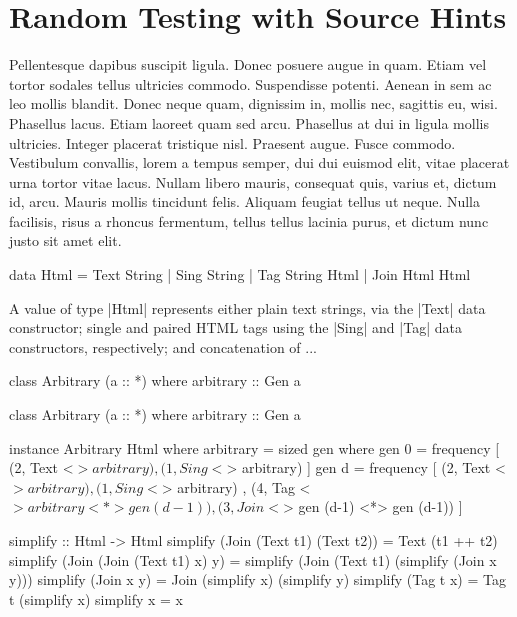 \section{Random Testing with Source Hints}
\label{sec:sources}

Pellentesque dapibus suscipit ligula. Donec posuere augue in quam. Etiam vel
tortor sodales tellus ultricies commodo. Suspendisse potenti. Aenean in sem ac
leo mollis blandit. Donec neque quam, dignissim in, mollis nec, sagittis eu,
wisi. Phasellus lacus. Etiam laoreet quam sed arcu. Phasellus at dui in ligula
mollis ultricies. Integer placerat tristique nisl. Praesent augue. Fusce
commodo. Vestibulum convallis, lorem a tempus semper, dui dui euismod elit,
vitae placerat urna tortor vitae lacus. Nullam libero mauris, consequat quis,
varius et, dictum id, arcu. Mauris mollis tincidunt felis. Aliquam feugiat
tellus ut neque. Nulla facilisis, risus a rhoncus fermentum, tellus tellus
lacinia purus, et dictum nunc justo sit amet elit.

\begin{code}
data Html
  =  Text  String
  |  Sing  String
  |  Tag   String Html
  |  Join  Html Html
\end{code}

A value of type |Html| represents either plain text strings, via the |Text| data
constructor; single and paired HTML tags using the |Sing| and |Tag| data
constructors, respectively; and concatenation of ...

\begin{code}
class Arbitrary (a :: *) where
  arbitrary :: Gen a
\end{code}

\begin{code}
class Arbitrary (a :: *) where
  arbitrary :: Gen a
\end{code}

\begin{code}
instance Arbitrary Html where
  arbitrary = sized gen
    where
      gen 0 = frequency
        [  (2,  Text    <$> arbitrary)
        ,  (1,  Sing    <$> arbitrary) ]
      gen d = frequency
        [  (2,  Text    <$> arbitrary)
        ,  (1,  Sing    <$> arbitrary)
        ,  (4,  Tag     <$> arbitrary  <*> gen (d-1))
        ,  (3,  Join    <$> gen (d-1)  <*> gen (d-1)) ]
\end{code} %



\begin{code}
simplify :: Html -> Html
simplify (Join (Text t1) (Text t2))
  = Text (t1 ++ t2)
simplify (Join (Join (Text t1) x) y)
  = simplify (Join (Text t1) (simplify (Join x y)))
simplify (Join x y)
  = Join (simplify x) (simplify y)
simplify (Tag t x)
  = Tag t (simplify x)
simplify x = x
\end{code}
